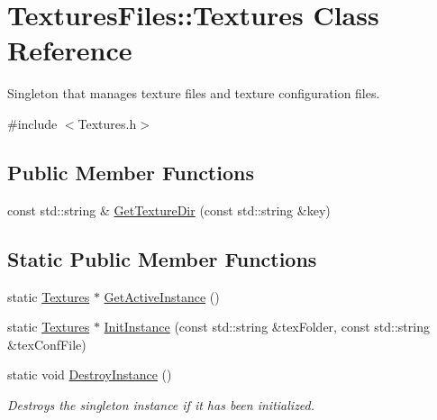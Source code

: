 \hypertarget{class_textures_files_1_1_textures}{}\section{Textures\+Files\+::Textures Class Reference}
\label{class_textures_files_1_1_textures}


Singleton that manages texture files and texture configuration files.  




{\ttfamily \#include $<$Textures.\+h$>$}

\subsection*{Public Member Functions}
\begin{DoxyCompactItemize}
\item 
const std\+::string \& \mbox{\hyperlink{class_textures_files_1_1_textures_ae484783c9a26a493e649cc5ccff166de}{Get\+Texture\+Dir}} (const std\+::string \&key)
\end{DoxyCompactItemize}
\subsection*{Static Public Member Functions}
\begin{DoxyCompactItemize}
\item 
static \mbox{\hyperlink{class_textures_files_1_1_textures}{Textures}} $\ast$ \mbox{\hyperlink{class_textures_files_1_1_textures_a32625c0cb26cc63df0b62b2be30994fd}{Get\+Active\+Instance}} ()
\item 
static \mbox{\hyperlink{class_textures_files_1_1_textures}{Textures}} $\ast$ \mbox{\hyperlink{class_textures_files_1_1_textures_a76d7462b113235e27422e143bde5e527}{Init\+Instance}} (const std\+::string \&tex\+Folder, const std\+::string \&tex\+Conf\+File)
\item 
\mbox{\label{class_textures_files_1_1_textures_ae8f1f1437f738c403764c12e36b694df}} 
static void \mbox{\hyperlink{class_textures_files_1_1_textures_ae8f1f1437f738c403764c12e36b694df}{Destroy\+Instance}} ()
\begin{DoxyCompactList}\small\item\em Destroys the singleton instance if it has been initialized. \end{DoxyCompactList}\end{DoxyCompactItemize}


